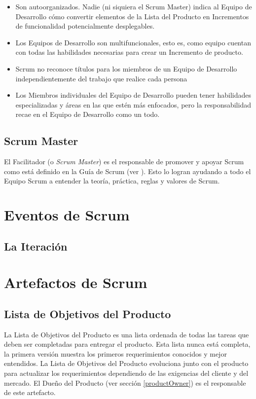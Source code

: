 \begin{itemize}
	\item Son autoorganizados. Nadie (ni siquiera el Scrum Master) indica al Equipo de Desarrollo cómo convertir elementos de la Lista del Producto en Incrementos de funcionalidad potencialmente desplegables.
	\item Los Equipos de Desarrollo son multifuncionales, esto es, como equipo cuentan con todas las habilidades necesarias para crear un Incremento de producto.
	\item Scrum no reconoce títulos para los miembros de un Equipo de Desarrollo independientemente del trabajo que realice cada persona
	\item Los Miembros individuales del Equipo de Desarrollo pueden tener habilidades especializadas y áreas en las que estén más enfocados, pero la responsabilidad recae en el Equipo de Desarrollo como un todo. 
\end{itemize}


\subsection{Scrum Master} \label{scrumMaster}

El Facilitador (o \emph{Scrum Master}) es el responsable de promover y apoyar Scrum como está definido en la Guía de Scrum (ver \cite{scrumSchwaber}). Esto lo logran ayudando a todo el Equipo Scrum a entender la teoría, práctica, reglas y valores de Scrum. \cite{scrumSchwaber}

\section{Eventos de Scrum}
\subsection{La Iteración} \label{sprint}


\section{Artefactos de Scrum}
\subsection{Lista de Objetivos del Producto} \label{productBacklog}
La Lista de Objetivos del Producto es una lista ordenada de todas las tareas que deben ser completadas para entregar el producto. Esta lista nunca está completa, la primera versión muestra los primeros requerimientos conocidos y mejor entendidos. \cite{scrumSchwaber} La Lista de Objetivos del Producto evoluciona junto con el producto para actualizar los requerimientos dependiendo de las exigencias del cliente y del mercado. El Dueño del Producto (ver sección \ref{productOwner}) es el responsable de este artefacto.

